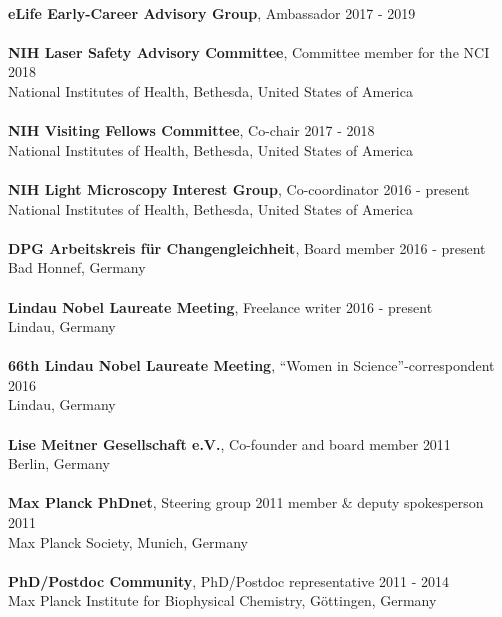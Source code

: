 \documentclass[margin,line]{res}
\begin{document}
\begin{resume}
\vspace*{-3mm}\\
{\bf eLife Early-Career Advisory Group}, Ambassador \hfill {2017 - 2019}\\
\vspace*{-3mm}\\
{\bf NIH Laser Safety Advisory Committee}, Committee member for the NCI \hfill {2018}\\
National Institutes of Health, Bethesda, United States of America\\
\vspace*{-3mm}\\
{\bf NIH Visiting Fellows Committee}, Co-chair \hfill {2017 - 2018}\\
National Institutes of Health, Bethesda, United States of America\\
\vspace*{-3mm}\\
{\bf NIH Light Microscopy Interest Group}, Co-coordinator \hfill {2016 - present}\\
National Institutes of Health, Bethesda, United States of America\\
\vspace*{-3mm}\\
{\bf DPG Arbeitskreis für Changengleichheit}, Board member \hfill {2016 - present}\\
Bad Honnef, Germany\\
\vspace*{-3mm}\\
{\bf Lindau Nobel Laureate Meeting}, Freelance writer \hfill {2016 - present}\\
Lindau, Germany\\
\vspace*{-3mm}\\
{\bf 66th Lindau Nobel Laureate Meeting}, “Women in Science”-correspondent \hfill {2016}\\
Lindau, Germany\\
\vspace*{-3mm}\\
{\bf Lise Meitner Gesellschaft e.V.}, Co-founder and board member \hfill {2011}\\
Berlin, Germany\\
\vspace*{-3mm}\\
{\bf Max Planck PhDnet}, Steering group 2011 member \& deputy spokesperson \hfill {2011}\\
Max Planck Society, Munich, Germany\\
\vspace*{-3mm}\\
{\bf PhD/Postdoc Community}, PhD/Postdoc representative \hfill {2011 - 2014}\\
Max Planck Institute for Biophysical Chemistry, Göttingen, Germany\\


\end{resume}
\end{document}
